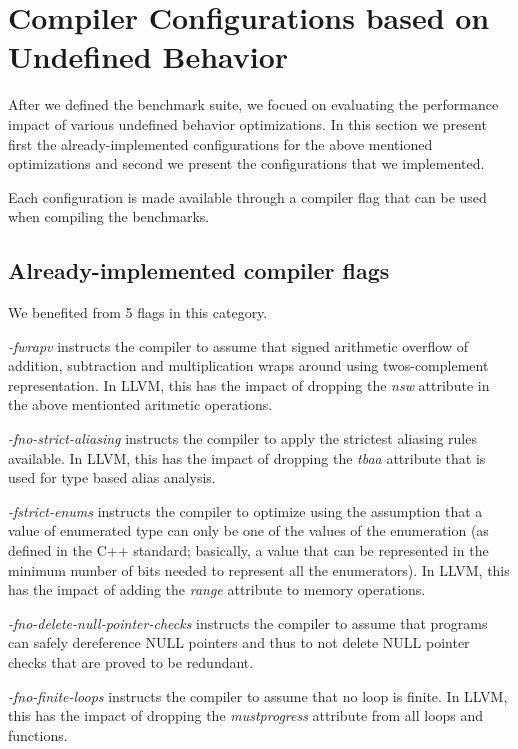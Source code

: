 \section{Compiler Configurations based on Undefined Behavior} \label{sec:flags}

After we defined the benchmark suite, we focued on evaluating the performance
impact of various undefined behavior optimizations. In this section we present
first the already-implemented configurations for the above mentioned
optimizations and second we present the configurations that we implemented.

Each configuration is made available through a compiler flag that can be used
when compiling the benchmarks.

\subsection{Already-implemented compiler flags}

We benefited from 5 flags in this category.

\textit{-fwrapv} instructs the compiler to assume that signed arithmetic
overflow of addition, subtraction and multiplication wraps around using
twos-complement representation. In LLVM, this has the impact of dropping the
\textit{nsw} attribute in the above mentionted aritmetic operations.

\textit{-fno-strict-aliasing} instructs the compiler to apply the strictest
aliasing rules available. In LLVM, this has the impact of dropping the
\textit{tbaa} attribute that is used for type based alias analysis.

\textit{-fstrict-enums} instructs the compiler to optimize using the assumption
that a value of enumerated type can only be one of the values of the enumeration
(as defined in the C++ standard; basically, a value that can be represented in
the minimum number of bits needed to represent all the enumerators). In LLVM,
this has the impact of adding the \textit{range} attribute to memory operations.

\textit{-fno-delete-null-pointer-checks} instructs the compiler to assume that
programs can safely dereference NULL pointers and thus to not delete NULL
pointer checks that are proved to be redundant.

\textit{-fno-finite-loops} instructs the compiler to assume that no loop is
finite. In LLVM, this has the impact of dropping the \textit{mustprogress}
attribute from all loops and functions.


